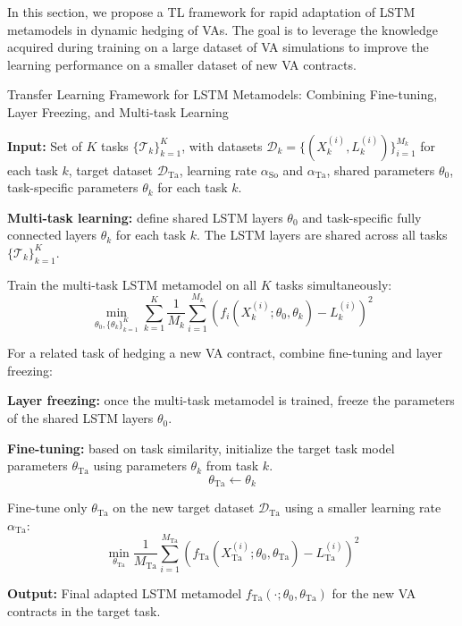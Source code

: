 In this section, we propose a TL framework for rapid adaptation of LSTM metamodels in dynamic hedging of VAs.
The goal is to leverage the knowledge acquired during training on a large dataset of VA simulations to improve the learning performance on a smaller dataset of new VA contracts.


\begin{algorithm}
    \caption{Transfer Learning Framework for LSTM Metamodels: Combining Fine-tuning, Layer Freezing, and Multi-task Learning}
    \begin{algorithmic}[1] \label{alg3:combined}
        \STATE \textbf{Input:} Set of $K$ tasks $\{\mathcal{T}_k\}_{k=1}^K$, with datasets $\mathcal{D}_k = \{(X_k^{(i)}, L_k^{(i)})\}_{i=1}^{M_k}$ for each task $k$, target dataset $\mathcal{D}_{\text{Ta}}$, learning rate $\alpha_{\text{So}}$ and $\alpha_{\text{Ta}}$, shared parameters $\theta_0$, task-specific parameters $\theta_k$ for each task $k$.
        
        \STATE \textbf{Multi-task learning:} define shared LSTM layers $\theta_0$ and task-specific fully connected layers $\theta_k$ for each task $k$. The LSTM layers are shared across all tasks $\{\mathcal{T}_k\}_{k=1}^K$.
        
        \STATE Train the multi-task LSTM metamodel on all $K$ tasks simultaneously:
        \begin{equation}
            \min_{\theta_0, \{\theta_k\}_{k=1}^K} \sum_{k=1}^K \frac{1}{M_k} \sum_{i=1}^{M_k} \left( f_i(X_k^{(i)}; \theta_0, \theta_k) - L_k^{(i)} \right)^2
        \end{equation}
        
        \STATE For a related task of hedging a new VA contract, combine fine-tuning and layer freezing:

        \STATE \textbf{Layer freezing:} once the multi-task metamodel is trained, freeze the parameters of the shared LSTM layers $\theta_0$.
        
        \STATE \textbf{Fine-tuning:}  based on task similarity, initialize the target task model parameters $\theta_{\text{Ta}}$ using parameters $\theta_k$ from task $k$.
        \[
        \theta_{\text{Ta}} \gets \theta_k 
        \]
        
        \STATE Fine-tune only $\theta_{\text{Ta}}$ on the new target dataset $\mathcal{D}_{\text{Ta}}$ using a smaller learning rate $\alpha_{\text{Ta}}$:
        \begin{equation}
            \min_{\theta_{\text{Ta}}} \frac{1}{M_{\text{Ta}}} \sum_{i=1}^{M_{\text{Ta}}} \left( f_{\text{Ta}}(X_{\text{Ta}}^{(i)}; \theta_0, \theta_{\text{Ta}}) - L_{\text{Ta}}^{(i)} \right)^2
        \end{equation}
        
        \STATE \textbf{Output:} Final adapted LSTM metamodel $f_{\text{Ta}}(\cdot; \theta_0, \theta_{\text{Ta}})$ for the new VA contracts in the target task.
    \end{algorithmic}
    \end{algorithm}


